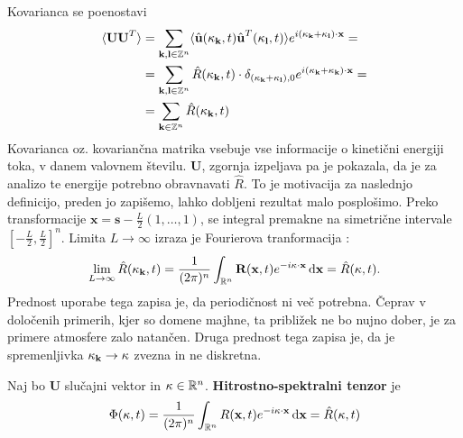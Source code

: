 \documentclass[mat2, tisk]{fmfdelo}
\newcommand{\R}{\mathbb R}
\newcommand{\Z}{\mathbb Z}
\newcommand{\bd}{\textbf}
\begin{document}
Kovarianca se poenostavi 
\begin{align*}
\langle \bd{U} \bd{U}^T\rangle &= \sum_{\bd{k}, \bd{l}\in \Z^{n}} \langle \hat{\bd{u}}(\bd{\text{$\kappa$}}_\bd{k}, t) \hat{\bd{u}}^T(\bd{\text{$\kappa$}}_\bd{l}, t) \rangle e^{i(\bd{\text{$\kappa$}}_\bd{k} + \bd{\text{$\kappa$}}_\bd{l})\cdot \bd{x}} = \\
&= \sum_{\bd{k}, \bd{l}\in \Z^{n}} \hat{R}(\text{\bd{$\kappa$}}_{\bd{k}}, t) \cdot \delta_{(\bd{\text{$\kappa$}}_{\bd{k}} + \bd{\text{$\kappa$}}_{\bd{l}}), 0} e^{i(\bd{\text{$\kappa$}}_\bd{k} + \bd{\text{$\kappa$}}_\bd{k})\cdot \bd{x}} = \\
&= \sum_{\bd{k}\in \Z^{n}} \hat{R}(\text{\bd{$\kappa$}}_{\bd{k}}, t)
\end{align*}
Kovarianca oz. kovariančna matrika vsebuje vse informacije o kinetični energiji toka, 
v danem valovnem številu.
$\bd{U}$, zgornja izpeljava pa je pokazala, da je za analizo te energije potrebno obravnavati 
$\hat{R}$. To je motivacija za naslednjo definicijo, preden jo zapišemo, 
lahko dobljeni rezultat malo posplošimo. Preko transformacije $\bd{x} = \bd{s} - \frac{L}{2}(1, \dots, 1)$, 
se integral premakne na simetrične intervale 
$\left[-\frac{L}{2}, \frac{L}{2}\right]^n$. Limita $L \rightarrow \infty$ izraza je 
Fourierova tranformacija :
\begin{align*}
\lim_{L\rightarrow \infty} \hat{R}(\bd{\text{$\kappa$}}_{\bd{k}}, t) = \frac{1}{(2\pi)^n}\int_{\R^n} \bd{R}(\bd{x}, t) e^{-i\text{\bd{$\kappa$}} \cdot \bd{x}} \dif \bd{x} = \hat{R}(\bd{\text{$\kappa$}}, t).
\end{align*}
Prednost uporabe tega zapisa je, da periodičnost ni več potrebna. Čeprav
v določenih primerih, kjer so domene majhne, ta približek ne bo nujno dober, 
je za primere atmosfere zalo natančen. Druga prednost tega zapisa je, da je 
spremenljivka $\bd{\text{$\kappa$}}_{\bd{k}} \rightarrow \bd{\text{$\kappa$}}$
zvezna in ne diskretna.

\begin{definicija}
Naj bo $\bd{U}$ slučajni vektor in $\text{\bd{$\kappa$}} \in \R^n$. \bd{Hitrostno-spektralni tenzor} je 
\begin{equation}
\Phi(\text{\bd{$\kappa$}}, t) = \frac{1}{(2\pi)^n}\int_{\R^n} {R}(\bd{x}, t) e^{-i\text{\bd{$\kappa$}} \cdot \bd{x}} \dif \bd{x} = \hat{R}(\bd{\text{$\kappa$}}, t)
\end{equation}
\end{definicija}
\end{document}
